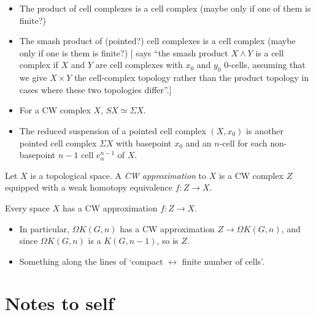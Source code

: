 \documentclass{MetricNotes2023}
\begin{document}
\begin{itemize}
\item The product of cell complexes is a cell complex (maybe only if one of them is finite?)
\item The smash product of (pointed?) cell complexes is a cell complex (maybe only if one is them is finite?) [\autocite{hatcher} says ``the smash product \(X\wedge Y\) is a cell complex if \(X\) and \(Y\) are cell complexes with \(x_0\) and \(y_0\) \(0\)-cells, assuming that we give \(X\times Y\) the cell-complex topology rather than the product topology in cases where these two topologies differ''.]
\item For a CW complex \(X\), \(SX\simeq \Sigma X\).
\item The reduced suspension of a pointed cell complex \((X, x_0)\) is another pointed cell complex \(\Sigma X\) with basepoint \(x_0\) and an \(n\)-cell for each non-basepoint \(n-1\) cell \(e^{n-1}_\alpha\) of \(X\).
\end{itemize}

\begin{definition}
Let \(X\) is a topological space. A \textit{CW approximation} to \(X\) is a CW complex \(Z\) equipped with a weak homotopy equivalence \(f : Z \to X\).
\end{definition}

\begin{theorem}
Every space \(X\) has a CW approximation \(f : Z \to X\). %
\end{theorem}

\begin{itemize}
\item In particular, \(\Omega K(G, n)\) has a CW approximation \(Z \to \Omega K(G, n)\), and since \(\Omega K(G,n)\) is a \(K(G,n-1)\), so is \(Z\). 
\item Something along the lines of `compact \(\leftrightarrow\) finite number of cells'.
\end{itemize}

\section{Notes to self}\label{C}
\end{document}
